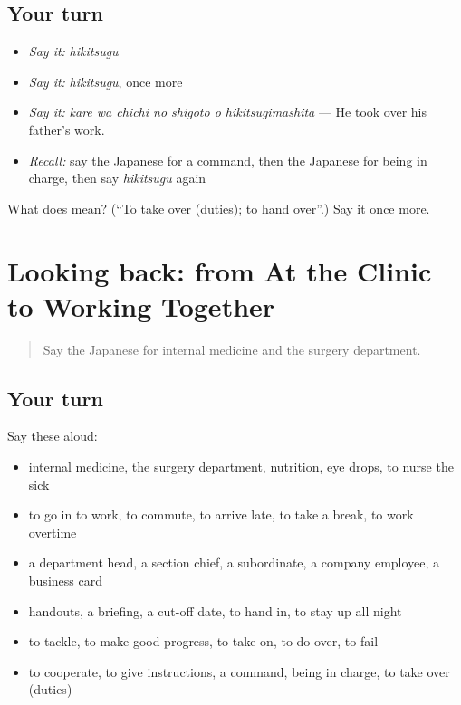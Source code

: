 \subsection*{Your turn}
\begin{itemize}
\raggedright
  \item \emph{Say it:} \emph{hikitsugu}
  \item \emph{Say it:} \emph{hikitsugu}, once more
  \item \emph{Say it:} \emph{kare wa chichi no shigoto o hikitsugimashita} — He took over his father's work.
  \item \emph{Recall:} say the Japanese for a command, then the Japanese for being in charge, then say \emph{hikitsugu} again
\end{itemize}

\begin{tcolorbox}[breakable,colback=teal!4,colframe=teal!35!black,title={Before you move on}]
What does  mean? (\textquotedblleft{}To take over (duties); to hand over\textquotedblright{}.) Say it once more.
\end{tcolorbox}
\section[(dialogue)]{Looking back: from At the Clinic to Working Together}

\label{lesson:JA-R455-review-450-455}



\begin{quote}
Say the Japanese for internal medicine and the surgery department.
\end{quote}

\subsection*{Your turn}
Say these aloud:

\begin{itemize}
\raggedright
  \item internal medicine, the surgery department, nutrition, eye drops, to nurse the sick
  \item to go in to work, to commute, to arrive late, to take a break, to work overtime
  \item a department head, a section chief, a subordinate, a company employee, a business card
  \item handouts, a briefing, a cut-off date, to hand in, to stay up all night
  \item to tackle, to make good progress, to take on, to do over, to fail
  \item to cooperate, to give instructions, a command, being in charge, to take over (duties)
\end{itemize}

